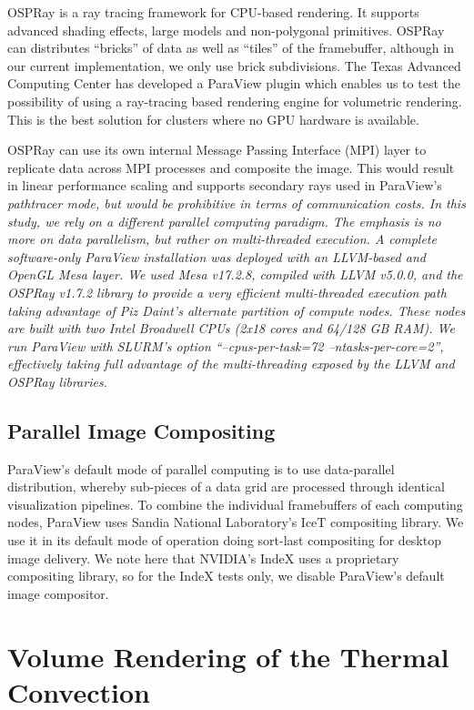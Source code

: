 \documentclass[5p,times]{elsarticle}
\begin{document}
OSPRay \cite{OSPRay} is a ray tracing framework for CPU-based rendering. It supports advanced 
shading effects, large models and non-polygonal primitives. OSPRay can distributes 
``bricks'' of data as well as ``tiles'' of the framebuffer, although in our current
implementation, we only use brick subdivisions. The Texas Advanced Computing Center
has developed a ParaView plugin which enables us to test the possibility of
using a ray-tracing based rendering engine for volumetric rendering. This is
the best solution for clusters where no GPU hardware is available.

OSPRay can use its own internal Message Passing Interface (MPI) layer to replicate
data across MPI processes and composite the image. This would result in linear
performance scaling and supports secondary rays used in ParaView's \it{pathtracer} \rm mode,
but would be prohibitive in terms of communication costs.
In this study, we rely on a different parallel computing paradigm.
The emphasis is no more on data parallelism, but rather on multi-threaded execution.
A complete \it{software-only} \rm ParaView installation was deployed with an LLVM-based and
OpenGL Mesa layer. We used Mesa v17.2.8, compiled with LLVM v5.0.0, and the
OSPRay v1.7.2 library to provide a very efficient multi-threaded execution path
taking advantage of Piz Daint's alternate partition of compute nodes. These nodes
are built with two Intel Broadwell CPUs (2x18 cores and 64/128 GB RAM). We run
ParaView with SLURM's option ``--cpus-per-task=72 --ntasks-per-core=2'', effectively
taking full advantage of the multi-threading exposed by the LLVM and OSPRay libraries. 

\subsection{Parallel Image Compositing}

ParaView's default mode of parallel computing is to use data-parallel distribution,
whereby sub-pieces of a data grid are processed through identical visualization
pipelines. To combine the individual framebuffers of each computing nodes,
ParaView uses Sandia National Laboratory's IceT \cite{MorelandKPH11} compositing
library. We use it in its default mode of operation doing sort-last compositing
for desktop image delivery. We note here that NVIDIA's IndeX uses a proprietary
compositing library, so for the IndeX tests only, we disable ParaView's default
image compositor.

\section{Volume Rendering of the Thermal Convection}
\end{document}
